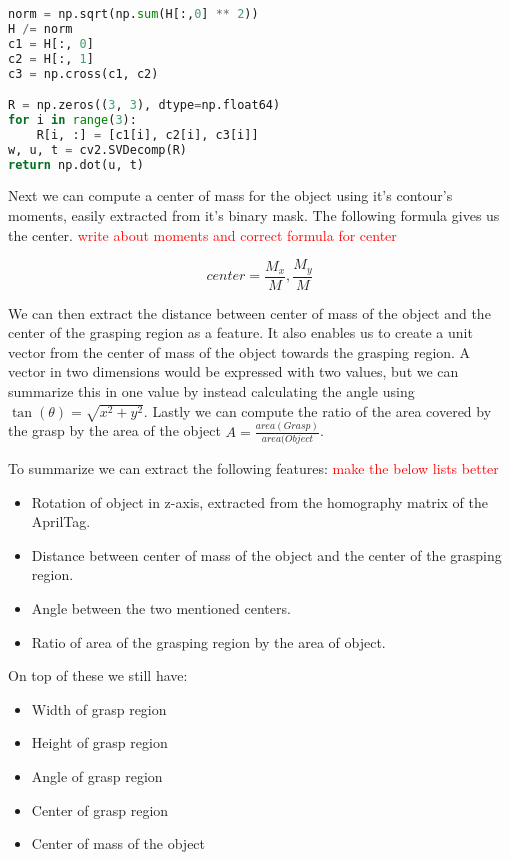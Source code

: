 \begin{lstlisting}[language=Python]
norm = np.sqrt(np.sum(H[:,0] ** 2))
H /= norm
c1 = H[:, 0]
c2 = H[:, 1]
c3 = np.cross(c1, c2)

R = np.zeros((3, 3), dtype=np.float64)
for i in range(3):
	R[i, :] = [c1[i], c2[i], c3[i]]
w, u, t = cv2.SVDecomp(R)
return np.dot(u, t)
\end{lstlisting}

Next we can compute a center of mass for the object using it's contour's moments, easily extracted from it's binary mask. The following formula gives us the center. \textcolor{red}{write about moments and correct formula for center}

\[
	center = \frac{M_x}{M}, \frac{M_y}{M}
\]

We can then extract the distance between center of mass of the object and the center of the grasping region as a feature. It also enables us to create a unit vector from the center of mass of the object towards the grasping region. A vector in two dimensions would be expressed with two values, but we can summarize this in one value by instead calculating the angle using \(\tan(\theta) = \sqrt{x^2 + y^2}\). Lastly we can compute the ratio of the area covered by the grasp by the area of the object \(A = \frac{area(Grasp)}{area(Object}\).

To summarize we can extract the following features: \textcolor{red}{make the below lists better}
\begin{itemize}
	\item Rotation of object in z-axis, extracted from the homography matrix of the AprilTag.
	\item Distance between center of mass of the object and the center of the grasping region.
	\item Angle between the two mentioned centers.
	\item Ratio of area of the grasping region by the area of object.
\end{itemize}

On top of these we still have:
\begin{itemize}
	\item Width of grasp region
	\item Height of grasp region
	\item Angle of grasp region
	\item Center of grasp region
	\item Center of mass of the object
\end{itemize}

